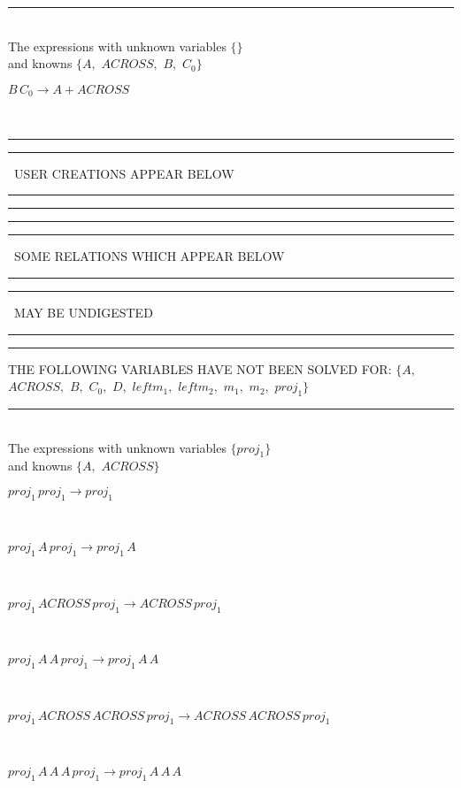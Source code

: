 \rule[3pt]{6in}{.7pt}\\
The expressions with unknown variables $\{\}$\\
and knowns $\{A,
$ $
ACROSS,
$ $
B,
$ $
C_{0}\}$\smallskip\\
\begin{minipage}{6in}
$
B\,
 C_{0}\rightarrow A + ACROSS
$
\end{minipage}\\
\rule[2pt]{6in}{1pt}\hfil\break
\rule[2.5pt]{1.701in}{1pt}
\ USER CREATIONS APPEAR BELOW\ 
\rule[2.5pt]{1.701in}{1pt}\hfil\break
\rule[2pt]{6in}{1pt}\hfil\break
\rule[2pt]{6in}{4pt}\hfil\break
\rule[2pt]{1.45in}{4pt}
\ SOME RELATIONS WHICH APPEAR BELOW\ 
\rule[2pt]{1.45in}{4pt}\hfil\break
\rule[2pt]{2.18in}{4pt}
\ MAY BE UNDIGESTED\ 
\rule[2pt]{2.18in}{4pt}\hfil\break
\rule[2pt]{6in}{4pt}\hfil\break
THE FOLLOWING VARIABLES HAVE NOT BEEN SOLVED FOR:\hfil\break
$\{A,
$ $
ACROSS,
$ $
B,
$ $
C_{0},
$ $
D,
$ $
leftm_{1},
$ $
leftm_{2},
$ $
m_{1},
$ $
m_{2},
$ $
proj_{1}\}$
\smallskip\\
\rule[3pt]{6in}{.7pt}\\
The expressions with unknown variables $\{proj_{1}\}$\\
and knowns $\{A,
$ $
ACROSS\}$\smallskip\\
\begin{minipage}{6in}
$
proj_{1}\,
 proj_{1}\rightarrow proj_{1}
$
\end{minipage}\medskip \\
\begin{minipage}{6in}
$
proj_{1}\,
 A\,
 proj_{1}\rightarrow proj_{1}\,
 A
$
\end{minipage}\medskip \\
\begin{minipage}{6in}
$
proj_{1}\,
 ACROSS\,
 proj_{1}\rightarrow ACROSS\,
 proj_{1}
$
\end{minipage}\medskip \\
\begin{minipage}{6in}
$
proj_{1}\,
 A\,
 A\,
 proj_{1}\rightarrow proj_{1}\,
 A\,
 A
$
\end{minipage}\medskip \\
\begin{minipage}{6in}
$
proj_{1}\,
 ACROSS\,
 ACROSS\,
 proj_{1}\rightarrow ACROSS\,
 ACROSS\,
 proj_{1}
$
\end{minipage}\medskip \\
\begin{minipage}{6in}
$
proj_{1}\,
 A\,
 A\,
 A\,
 proj_{1}\rightarrow proj_{1}\,
 A\,
 A\,
 A
$
\end{minipage}\medskip \\
